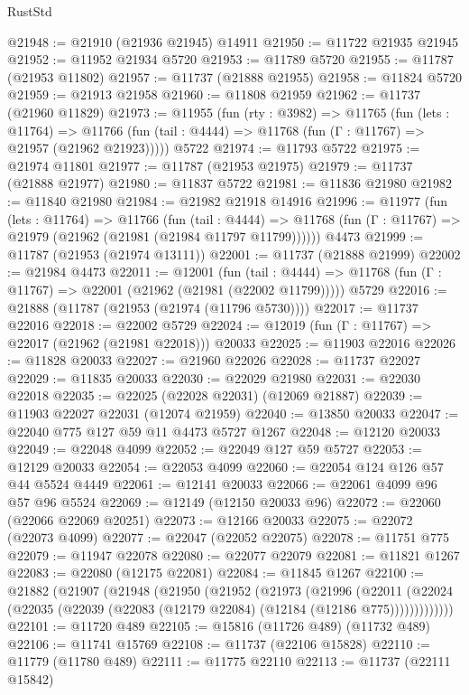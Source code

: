 \begin{lexlean}{RustStd}
\begin{coremodule}
@21948 := @21910 (@21936 @21945) @14911
@21950 := @11722 @21935 @21945
@21952 := @11952 @21934 @5720
@21953 := @11789 @5720
@21955 := @11787 (@21953 @11802)
@21957 := @11737 (@21888 @21955)
@21958 := @11824 @5720
@21959 := @21913 @21958
@21960 := @11808 @21959
@21962 := @11737 (@21960 @11829)
@21973 := @11955
    (fun (rty : @3982) =>
    @11765
      (fun (lets : @11764) =>
      @11766 (fun (tail : @4444) => @11768 (fun (Γ : @11767) => @21957 (@21962 @21923)))))
    @5722
@21974 := @11793 @5722
@21975 := @21974 @11801
@21977 := @11787 (@21953 @21975)
@21979 := @11737 (@21888 @21977)
@21980 := @11837 @5722
@21981 := @11836 @21980
@21982 := @11840 @21980
@21984 := @21982 @21918 @14916
@21996 := @11977
    (fun (lets : @11764) =>
    @11766
      (fun (tail : @4444) =>
      @11768 (fun (Γ : @11767) => @21979 (@21962 (@21981 (@21984 @11797 @11799))))))
    @4473
@21999 := @11787 (@21953 (@21974 @13111))
@22001 := @11737 (@21888 @21999)
@22002 := @21984 @4473
@22011 := @12001
    (fun (tail : @4444) => @11768 (fun (Γ : @11767) => @22001 (@21962 (@21981 (@22002 @11799)))))
    @5729
@22016 := @21888 (@11787 (@21953 (@21974 (@11796 @5730))))
@22017 := @11737 @22016
@22018 := @22002 @5729
@22024 := @12019 (fun (Γ : @11767) => @22017 (@21962 (@21981 @22018))) @20033
@22025 := @11903 @22016
@22026 := @11828 @20033
@22027 := @21960 @22026
@22028 := @11737 @22027
@22029 := @11835 @20033
@22030 := @22029 @21980
@22031 := @22030 @22018
@22035 := @22025 (@22028 @22031) (@12069 @21887)
@22039 := @11903 @22027 @22031 (@12074 @21959)
@22040 := @13850 @20033
@22047 := @22040 @775 @127 @59 @11 @4473 @5727 @1267
@22048 := @12120 @20033
@22049 := @22048 @4099
@22052 := @22049 @127 @59 @5727
@22053 := @12129 @20033
@22054 := @22053 @4099
@22060 := @22054 @124 @126 @57 @44 @5524 @4449
@22061 := @12141 @20033
@22066 := @22061 @4099 @96 @57 @96 @5524
@22069 := @12149 (@12150 @20033 @96)
@22072 := @22060 (@22066 @22069 @20251)
@22073 := @12166 @20033
@22075 := @22072 (@22073 @4099)
@22077 := @22047 (@22052 @22075)
@22078 := @11751 @775
@22079 := @11947 @22078
@22080 := @22077 @22079
@22081 := @11821 @1267
@22083 := @22080 (@12175 @22081)
@22084 := @11845 @1267
@22100 := @21882
    (@21907
      (@21948
        (@21950
          (@21952
            (@21973
              (@21996
                (@22011
                  (@22024 (@22035 (@22039 (@22083 (@12179 @22084) (@12184 (@12186 @775)))))))))))))
@22101 := @11720 @489
@22105 := @15816 (@11726 @489) (@11732 @489)
@22106 := @11741 @15769
@22108 := @11737 (@22106 @15828)
@22110 := @11779 (@11780 @489)
@22111 := @11775 @22110
@22113 := @11737 (@22111 @15842)

\end{coremodule}
\end{lexlean}

